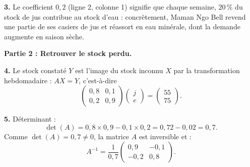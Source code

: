 \documentclass[11pt]{article}
\begin{document}
\begin{exoresolu}
\textbf{3.} Le coefficient $0,2$ (ligne 2, colonne 1) signifie que chaque semaine, $20\,\%$ du stock de jus contribue au stock d'eau : concrètement, Maman Ngo Bell revend une partie de ses casiers de jus et réassort en eau minérale, dont la demande augmente en saison sèche.

\textbf{Partie 2 : Retrouver le stock perdu.}

\textbf{4.} Le stock constaté $Y$ est l'image du stock inconnu $X$ par la transformation hebdomadaire : $A X = Y$, c'est-à-dire
\[
\begin{pmatrix} 0,8 & 0,1 \\ 0,2 & 0,9 \end{pmatrix} \begin{pmatrix} j \\ e \end{pmatrix} = \begin{pmatrix} 55 \\ 75 \end{pmatrix}.
\]

\textbf{5.} Déterminant :
\[
\det(A) = 0,8 \times 0,9 - 0,1 \times 0,2 = 0,72 - 0,02 = 0,7.
\]
Comme $\det(A) = 0,7 \neq 0$, la matrice $A$ est inversible et :
\[
A^{-1} = \frac{1}{0,7} \begin{pmatrix} 0,9 & -0,1 \\ -0,2 & 0,8 \end{pmatrix}.
\]


\end{exoresolu}
\end{document}
